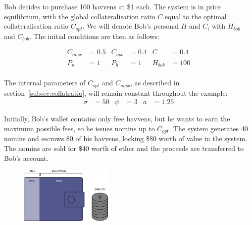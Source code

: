 \noindent Bob decides to purchase 100 havvens at \$1 each.
The system is in price equilibrium, with the global collateralisation
ratio \(C\) equal to the optimal collateralisation ratio
\(C_{opt}\). We will denote Bob's personal \(H\) and \(C_i\) with
\(H_{bob}\) and \(C_{bob}\). The initial conditions are then as follows:

\begin{align*}
    C_{max} &= 0.5 & C_{opt} &= 0.4 & C &= 0.4 \\
    P_n &= 1 & P_h &= 1 & H_{bob} &= 100 \\
\end{align*}

\noindent The internal parameters of \(C_{opt}\) and \(C_{max}\), as described in
section~\ref{subsec:collatratio}, will remain constant throughout the example:
\begin{align*}
    \sigma &= 50 & \psi &= 3 & a&= 1.25
\end{align*}

\noindent Initially, Bob's wallet contains only free havvens, but he wants to
earn the maximum possible fees, so he issues nomins up to \(C_{opt}\).
The system generates 40 nomins and escrows 80 of his havvens,
locking \$80 worth of value in the system. The nomins are sold for \$40 worth
of ether and the proceeds are transferred to Bob's account.


\begin{figure}[h!]
    \centering
    \includegraphics[width=0.40\textwidth]{img/escrowed}
\end{figure}

